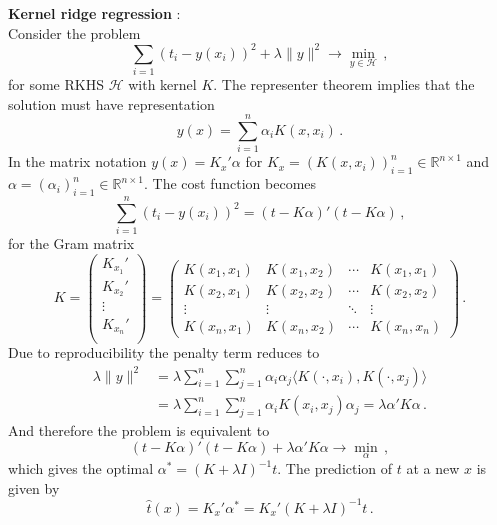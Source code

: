 \documentclass[a4paper]{article}
\newcommand{\Real}{\mathbb{R}}
\newcommand{\Hcal}{\mathcal{H}}
\begin{document}
\noindent\textbf{Kernel ridge regression} : \hfill\\
Consider the problem
\[ \sum_{i=1} (t_i - y(x_i))^2 + \lambda \|y\|^2 \to \min_{y\in \Hcal}\,,\]
for some RKHS $\Hcal$ with kernel $K$. The representer theorem implies that the
solution must have representation
\[ y(x) = \sum_{i=1}^n \alpha_i K(x, x_i)\,. \]
In the matrix notation $y(x) = K_x' \alpha$ for $K_x = (K(x,x_i))_{i=1}^n \in \Real^{n\times 1}$
and $\alpha = (\alpha_i)_{i=1}^n \in \Real^{n\times 1}$. The cost function
becomes	
\[
\sum_{i=1}^n (t_i - y(x_i))^2 = (t-K\alpha)'(t-K\alpha)\,,
\]
for the Gram matrix
\[
K = \begin{pmatrix} K_{x_1}'\\ K_{x_2}'\\ \vdots\\ K_{x_n}'\\ \end{pmatrix}
 = \begin{pmatrix}
		K(x_1,x_1) & K(x_1,x_2) & \cdots & K(x_1,x_1) \\
		K(x_2,x_1) & K(x_2,x_2) & \cdots & K(x_2,x_2) \\
		\vdots & \vdots & \ddots & \vdots \\
		K(x_n,x_1) & K(x_n,x_2) & \cdots & K(x_n,x_n)
	\end{pmatrix}\,.
\]
Due to reproducibility the penalty term reduces to
\begin{align*}
	\lambda \|y\|^2
	&= \lambda \sum_{i=1}^n \sum_{j=1}^n \alpha_i \alpha_j \langle K(\cdot,x_i), K(\cdot,x_j)\rangle\\
	&= \lambda \sum_{i=1}^n \sum_{j=1}^n \alpha_i K(x_i,x_j) \alpha_j
	= \lambda \alpha' K \alpha\,.
\end{align*}
And therefore the problem is equivalent to
\[ (t-K\alpha)'(t-K\alpha) + \lambda \alpha' K \alpha \to \min_\alpha\,,\]
which gives the optimal $\alpha^* = (K+\lambda I)^{-1} t$. The prediction of $t$
at a new $x$ is given by
\[ \hat{t}(x) = K_x'\alpha^* = K_x' (K+\lambda I)^{-1} t \,. \]

\end{document}
